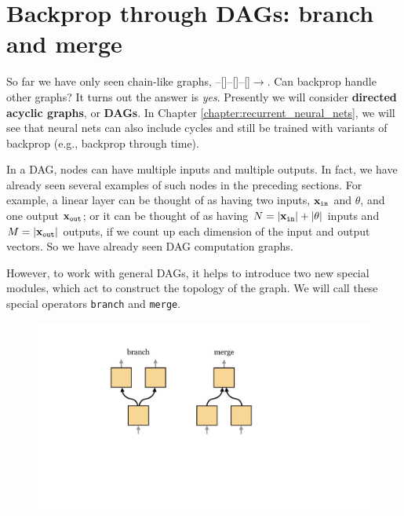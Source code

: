 \section{Backprop through DAGs: branch and merge}

So far we have only seen chain-like graphs, --[]--[]--[]$\rightarrow$. Can backprop handle other graphs? It turns out the answer is \textit{yes}. Presently we will consider {\bf directed acyclic graphs}, or {\bf DAGs}. In Chapter \ref{chapter:recurrent_neural_nets}, we will see that neural nets can also include cycles and still be trained with variants of backprop (e.g., backprop through time).

In a DAG, nodes can have multiple inputs and multiple outputs. In fact, we have already seen several examples of such nodes in the preceding sections. For example, a linear layer can be thought of as having two inputs, $\mathbf{x}_{\texttt{in}}$ and $\theta$, and one output $\mathbf{x}_{\texttt{out}}$; or it can be thought of as having $N = |\mathbf{x}_{\texttt{in}}| + |\theta|$ inputs and $M = |\mathbf{x}_{\texttt{out}}|$ outputs, if we count up each dimension of the input and output vectors. So we have already seen DAG computation graphs.

However, to work with general DAGs, it helps to introduce two new special modules, which act to construct the topology of the graph. We will call these special operators \texttt{branch} and \texttt{merge}. %
\begin{figure}[h]
    \centering
    \includegraphics[width=0.42\linewidth]{./figures/backpropagation/branch_merge.pdf}
    \label{fig:backprop_branch_merge}
\end{figure}

